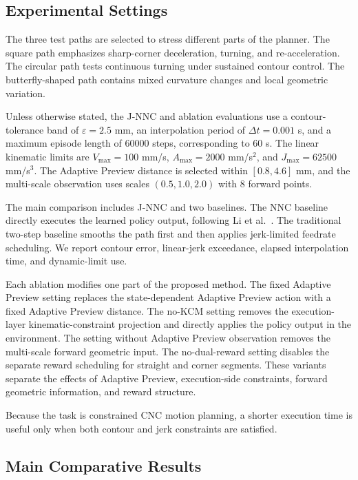 \documentclass[preprint,12pt]{elsarticle}
\begin{document}
\subsection{Experimental Settings}

The three test paths are selected to stress different parts of the planner. The square path emphasizes sharp-corner deceleration, turning, and re-acceleration. The circular path tests continuous turning under sustained contour control. The butterfly-shaped path contains mixed curvature changes and local geometric variation.

Unless otherwise stated, the J-NNC and ablation evaluations use a contour-tolerance band of $\varepsilon=2.5$ mm, an interpolation period of $\Delta t=0.001$ s, and a maximum episode length of $60000$ steps, corresponding to $60$ s. The linear kinematic limits are $V_{\max}=100$ mm/s, $A_{\max}=2000$ mm/s$^2$, and $J_{\max}=62500$ mm/s$^3$. The Adaptive Preview distance is selected within $[0.8,4.6]$ mm, and the multi-scale observation uses scales $(0.5,1.0,2.0)$ with $8$ forward points.

The main comparison includes J-NNC and two baselines. The NNC baseline directly executes the learned policy output, following Li et al.~\cite{Li2020}. The traditional two-step baseline smooths the path first and then applies jerk-limited feedrate scheduling. We report contour error, linear-jerk exceedance, elapsed interpolation time, and dynamic-limit use.

Each ablation modifies one part of the proposed method. The fixed Adaptive Preview setting replaces the state-dependent Adaptive Preview action with a fixed Adaptive Preview distance. The no-KCM setting removes the execution-layer kinematic-constraint projection and directly applies the policy output in the environment. The setting without Adaptive Preview observation removes the multi-scale forward geometric input. The no-dual-reward setting disables the separate reward scheduling for straight and corner segments. These variants separate the effects of Adaptive Preview, execution-side constraints, forward geometric information, and reward structure.

Because the task is constrained CNC motion planning, a shorter execution time is useful only when both contour and jerk constraints are satisfied.

\subsection{Main Comparative Results}
\end{document}
